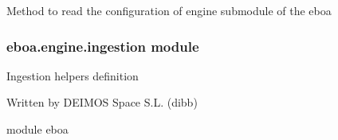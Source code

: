 \begin{fulllineitems}
\label{\detokenize{eboa.engine:eboa.engine.functions.is_valid_values_name_type_like}}
\end{fulllineitems}


\begin{fulllineitems}
\label{\detokenize{eboa.engine:eboa.engine.functions.is_valid_values_names_type}}
\end{fulllineitems}


\begin{fulllineitems}
\label{\detokenize{eboa.engine:eboa.engine.functions.read_configuration}}
Method to read the configuration of engine submodule of the eboa

\end{fulllineitems}



\subsubsection{eboa.engine.ingestion module}
\label{\detokenize{eboa.engine:module-eboa.engine.ingestion}}\label{\detokenize{eboa.engine:eboa-engine-ingestion-module}}
Ingestion helpers definition

Written by DEIMOS Space S.L. (dibb)

module eboa

